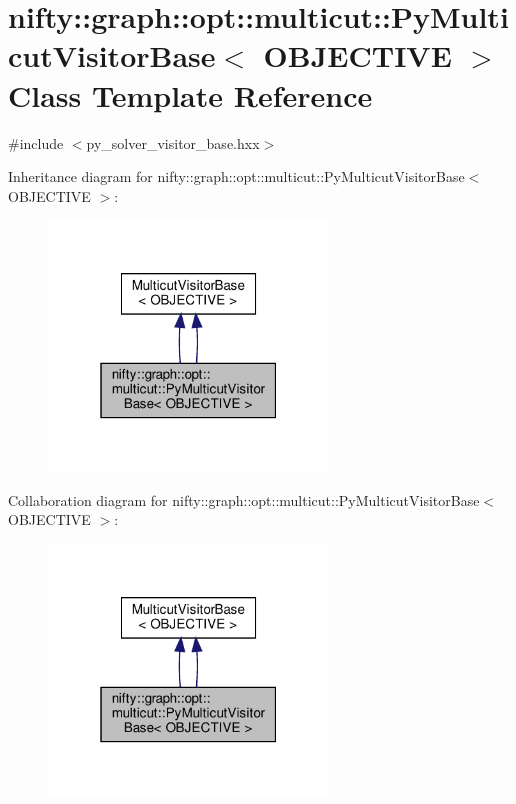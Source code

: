\hypertarget{classnifty_1_1graph_1_1opt_1_1multicut_1_1PyMulticutVisitorBase}{}\section{nifty\+:\+:graph\+:\+:opt\+:\+:multicut\+:\+:Py\+Multicut\+Visitor\+Base$<$ O\+B\+J\+E\+C\+T\+I\+VE $>$ Class Template Reference}
\label{classnifty_1_1graph_1_1opt_1_1multicut_1_1PyMulticutVisitorBase}


{\ttfamily \#include $<$py\+\_\+solver\+\_\+visitor\+\_\+base.\+hxx$>$}



Inheritance diagram for nifty\+:\+:graph\+:\+:opt\+:\+:multicut\+:\+:Py\+Multicut\+Visitor\+Base$<$ O\+B\+J\+E\+C\+T\+I\+VE $>$\+:
\nopagebreak
\begin{figure}[H]
\begin{center}
\leavevmode
\includegraphics[width=211pt]{classnifty_1_1graph_1_1opt_1_1multicut_1_1PyMulticutVisitorBase__inherit__graph}
\end{center}
\end{figure}


Collaboration diagram for nifty\+:\+:graph\+:\+:opt\+:\+:multicut\+:\+:Py\+Multicut\+Visitor\+Base$<$ O\+B\+J\+E\+C\+T\+I\+VE $>$\+:
\nopagebreak
\begin{figure}[H]
\begin{center}
\leavevmode
\includegraphics[width=211pt]{classnifty_1_1graph_1_1opt_1_1multicut_1_1PyMulticutVisitorBase__coll__graph}
\end{center}
\end{figure}
